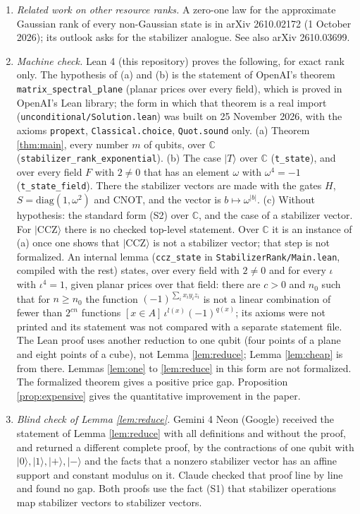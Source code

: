 \documentclass[11pt]{article}
\theoremstyle{definition}
\newcommand{\ket}[1]{|#1\rangle}
\newcommand{\C}{\mathbb C}
\begin{document}
\begin{enumerate}
\item \emph{Related work on other resource ranks.} A zero-one law for the approximate Gaussian rank of every non-Gaussian state is in arXiv 2610.02172 (1 October 2026); its outlook asks for the stabilizer analogue. See also arXiv 2610.03699.
\item \emph{Machine check.} Lean 4 (this repository) proves the following, for exact rank only. The hypothesis of (a) and (b) is the statement of OpenAI's theorem \texttt{matrix\_spectral\_plane} (planar prices over every field), which is proved in OpenAI's Lean library; the form in which that theorem is a real import (\texttt{unconditional/Solution.lean}) was built on 25 November 2026, with the axioms \texttt{propext}, \texttt{Classical.choice}, \texttt{Quot.sound} only. (a) Theorem \ref{thm:main}, every number $m$ of qubits, over $\C$ (\texttt{stabilizer\_rank\_exponential}). (b) The case $\ket T$ over $\C$ (\texttt{t\_state}), and over every field $F$ with $2\ne0$ that has an element $\omega$ with $\omega^4=-1$ (\texttt{t\_state\_field}). There the stabilizer vectors are made with the gates $H$, $S=\mathrm{diag}(1,\omega^2)$ and CNOT, and the vector is $b\mapsto\omega^{|b|}$. (c) Without hypothesis: the standard form (S2) over $\C$, and the case of a stabilizer vector. For $\ket{\mathrm{CCZ}}$ there is no checked top-level statement. Over $\C$ it is an instance of (a) once one shows that $\ket{\mathrm{CCZ}}$ is not a stabilizer vector; that step is not formalized. An internal lemma (\texttt{ccz\_state} in \texttt{StabilizerRank/Main.lean}, compiled with the rest) states, over every field with $2\ne0$ and for every $\iota$ with $\iota^4=1$, given planar prices over that field: there are $c>0$ and $n_0$ such that for $n\ge n_0$ the function $(-1)^{\sum_ix_iy_iz_i}$ is not a linear combination of fewer than $2^{cn}$ functions $[x\in A]\,\iota^{l(x)}(-1)^{q(x)}$; its axioms were not printed and its statement was not compared with a separate statement file. The Lean proof uses another reduction to one qubit (four points of a plane and eight points of a cube), not Lemma \ref{lem:reduce}; Lemma \ref{lem:cheap} is from there. Lemmas \ref{lem:one} to \ref{lem:reduce} in this form are not formalized. The formalized theorem gives a positive price gap. Proposition \ref{prop:expensive} gives the quantitative improvement in the paper.
\item \emph{Blind check of Lemma \ref{lem:reduce}.} Gemini 4 Neon (Google) received the statement of Lemma \ref{lem:reduce} with all definitions and without the proof, and returned a different complete proof, by the contractions of one qubit with $\ket0,\ket1,\ket+,\ket-$ and the facts that a nonzero stabilizer vector has an affine support and constant modulus on it. Claude checked that proof line by line and found no gap. Both proofs use the fact (S1) that stabilizer operations map stabilizer vectors to stabilizer vectors.

\end{enumerate}
\end{document}
